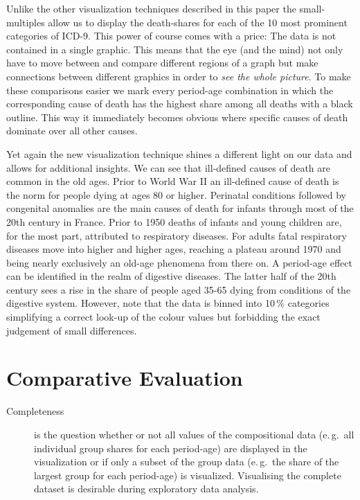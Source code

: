 \documentclass{scrartcl}
\begin{document}
Unlike the other visualization techniques described in this paper the small-multiples allow us to display the death-shares for each of the 10 most prominent categories of ICD-9. This power of course comes with a price: The data is not contained in a single graphic. This means that the eye (and the mind) not only have to move between and compare different regions of a graph but make connections between different graphics in order to \emph{see the whole picture}. To make these comparisons easier we mark every period-age combination in which the corresponding cause of death has the highest share among all deaths with a black outline. This way it immediately becomes obvious where specific causes of death dominate over all other causes.

Yet again the new visualization technique shines a different light on our data and allows for additional insights. We can see that ill-defined causes of death are common in the old ages. Prior to World War II an ill-defined cause of death is the norm for people dying at ages 80 or higher. Perinatal conditions followed by congenital anomalies are the main causes of death for infants through most of the 20th century in France. Prior to 1950 deaths of infants and young children are, for the most part, attributed to respiratory diseases. For adults fatal respiratory diseases move into higher and higher ages, reaching a plateau around 1970 and being nearly exclusively an old-age phenomena from there on. A period-age effect can be identified in the realm of digestive diseases. The latter half of the 20th century sees a rise in the share of people aged 35-65 dying from conditions of the digestive system. However, note that the data is binned into 10\,\% categories simplifying a correct look-up of the colour values but forbidding the exact judgement of small differences.

\clearpage

\section{Comparative Evaluation} %
\label{sec:eval}

\begin{description}
  \item[Completeness] is the question whether or not all values of the compositional data (e.\,g.~all individual group shares for each period-age) are displayed in the visualization or if only a subset of the group data (e.\,g.~the share of the largest group for each period-age) is visualized. Visualising the complete dataset is desirable during exploratory data analysis.
\end{description}
\end{document}
